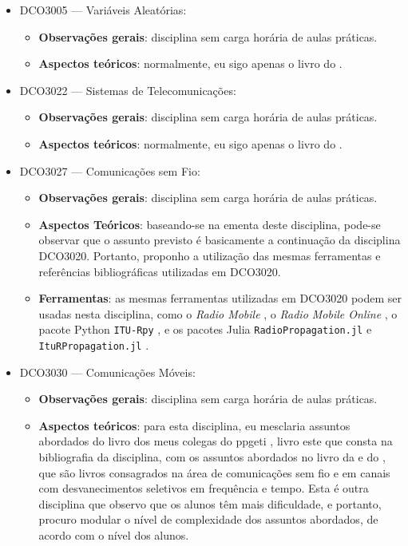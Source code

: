 \documentclass{article}
\begin{document}
\begin{itemize}
\begin{itemize}
    \end{itemize}
    \item DCO3005 --- Variáveis Aleatórias:
    \begin{itemize}
        \item \textbf{Observações gerais}: disciplina sem carga horária de aulas práticas.
        \item \textbf{Aspectos teóricos}: normalmente, eu sigo apenas o livro do \textcite{papoulisProbabilityRandomVariables2001}.
    \end{itemize}
    \item DCO3022 --- Sistemas de Telecomunicações:
    \begin{itemize}
        \item \textbf{Observações gerais}: disciplina sem carga horária de aulas práticas.
        \item \textbf{Aspectos teóricos}: normalmente, eu sigo apenas o livro do \textcite{jeszensky2004sistemas}.
    \end{itemize}
    \item DCO3027 --- Comunicações sem Fio:
    \begin{itemize}
        \item \textbf{Observações gerais}: disciplina sem carga horária de aulas práticas.
        \item \textbf{Aspectos Teóricos}: baseando-se na ementa deste disciplina, pode-se observar que o assunto previsto é basicamente a continuação da disciplina DCO3020. Portanto, proponho a utilização das mesmas ferramentas e referências bibliográficas utilizadas em DCO3020.
        \item \textbf{Ferramentas}: as mesmas ferramentas utilizadas em DCO3020 podem ser usadas nesta disciplina, como o \textit{Radio Mobile} \cite{rogercoudeRadioMobile1988}, o \textit{Radio Mobile Online} \cite{rogercoudeRadioMobileOnline2012}, o pacote Python \texttt{ITU-Rpy} \cite{portilloInigodelportilloITURpy2026}, e os pacotes Julia \texttt{RadioPropagation.jl} \cite{buerErikBuerRadioPropagationjl2026} e \texttt{ItuRPropagation.jl} \cite{kchaoHillaryKchaoItuRPropagationjl2026}.
    \end{itemize}
    \item DCO3030 --- Comunicações Móveis:
    \begin{itemize}
        \item \textbf{Observações gerais}: disciplina sem carga horária de aulas práticas.
        \item \textbf{Aspectos teóricos}: para esta disciplina, eu mesclaria assuntos abordados do livro dos meus colegas do \gls{ppgeti} \cite{cavalcantiComunicacaoMovelCelular2018}, livro este que consta na bibliografia da disciplina, com os assuntos abordados no livro da \textcite{goldsmithWirelessCommunications2005} e do \textcite{rappaportWirelessCommunicationsPrinciples2001}, que são livros consagrados na área de comunicações sem fio e em canais com desvanecimentos seletivos em frequência e tempo. Esta é outra disciplina que observo que os alunos têm mais dificuldade, e portanto, procuro modular o nível de complexidade dos assuntos abordados, de acordo com o nível dos alunos.

\end{itemize}
\end{itemize}
\end{document}
